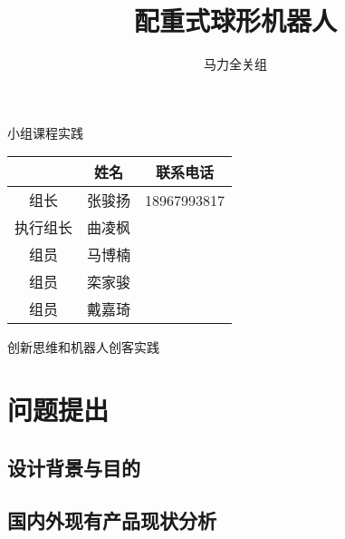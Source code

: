 \documentclass[a4paper]{ctexart}
\title{配重式球形机器人}
\author{马力全关组}
\numberwithin{equation}{section}
\numberwithin{table}{section}
\numberwithin{figure}{section}
\begin{document}


\begin{titlepage}

  \maketitle
  \begin{center}
    小组课程实践
  \end{center}


  \begin{longtable}[]{@{}ccc@{}}
  \toprule
   & 姓名 & 联系电话\tabularnewline
  \midrule
  \endhead
  组长 & 张骏扬 & 18967993817\tabularnewline
  执行组长 & 曲凌枫 & \tabularnewline
  组员 & 马博楠 & \tabularnewline
  组员 & 栾家骏 & \tabularnewline
  组员 & 戴嘉琦 & \tabularnewline
  \bottomrule
  \end{longtable}
  \addtocounter{table}{-1}

  
\begin{center}
  创新思维和机器人创客实践
\end{center}

\thispagestyle{empty}

\end{titlepage}

\addtocounter{page}{-2}

\newpage

\thispagestyle{fancy}
\lhead{}
\chead{\it\small{\textcolor{grey}{目录}}}
\rhead{}
\cfoot{}

\tableofcontents

\newpage


\pagestyle{fancy}
\fancyhead[RE, LO]{\it\small\rightmark}
\fancyhead[C]{\small{\it\textcolor{grey}{配重式球形机器人}}}

\section{问题提出}

\subsection{设计背景与目的}

\subsection{国内外现有产品现状分析}
\end{document}

